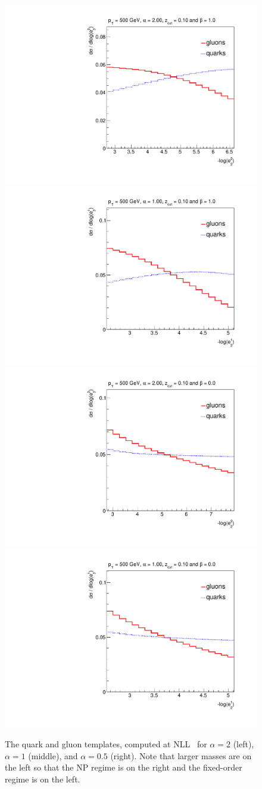 \begin{figure}[t]
\begin{center}
\includegraphics[width = 0.49\columnwidth]{figures/PDFs_alpha_20zcut1_beta_1023451324.pdf}\includegraphics[width = 0.49\columnwidth]{figures/PDFs_alpha_10zcut1_beta_1023451324.pdf}\\
\includegraphics[width = 0.49\columnwidth]{figures/PDFs_alpha_20zcut1_beta_023451324.pdf}\includegraphics[width = 0.49\columnwidth]{figures/PDFs_alpha_10zcut1_beta_023451324.pdf}
\end{center}
\caption{The quark and gluon templates, computed at NLL~\cite{Marzani:2017mva,Marzani:2017kqd} for $\alpha=2$ (left),
  $\alpha=1$ (middle), and $\alpha=0.5$ (right).  Note that larger masses are on the left so that the NP regime is on the
  right and the fixed-order regime is on the left.}
\label{fig:templates}
\end{figure}
	
